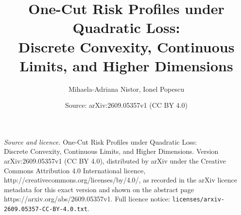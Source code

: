 \documentclass[10pt,a4paper]{amsart}
\title{One-Cut Risk Profiles under Quadratic Loss:\\ Discrete Convexity, Continuous Limits, and Higher Dimensions}
\author{Mihaela-Adriana Nistor, Ionel Popescu}
\date{Source: arXiv:2609.05357v1 (CC BY 4.0)}
\begin{document}
\maketitle

\noindent\emph{Source and licence.} One-Cut Risk Profiles under Quadratic Loss:\\ Discrete Convexity, Continuous Limits, and Higher Dimensions. Version arXiv:2609.05357v1 (CC BY 4.0), distributed by arXiv under the Creative Commons Attribution 4.0 International licence, http://creativecommons.org/licenses/by/4.0/, as recorded in the arXiv licence metadata for this exact version and shown on the abstract page https://arxiv.org/abs/2609.05357v1. Full licence notice: \texttt{licenses/arxiv-2609.05357-CC-BY-4.0.txt}.\par\smallskip
\end{document}
